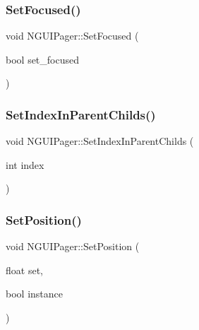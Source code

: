\hypertarget{class_n_g_u_i_pager_ab2f05ba0b7444f33beaf92d283229c4c}{}\label{class_n_g_u_i_pager_ab2f05ba0b7444f33beaf92d283229c4c} 
\subsubsection{\texorpdfstring{Set\+Focused()}{SetFocused()}}
{\footnotesize\ttfamily void N\+G\+U\+I\+Pager\+::\+Set\+Focused (\begin{DoxyParamCaption}\item[{bool}]{set\+\_\+focused }\end{DoxyParamCaption})}

\hypertarget{class_n_g_u_i_pager_a8d08d8f767486ec0a5f9ab402c1a97bc}{}\label{class_n_g_u_i_pager_a8d08d8f767486ec0a5f9ab402c1a97bc} 
\subsubsection{\texorpdfstring{Set\+Index\+In\+Parent\+Childs()}{SetIndexInParentChilds()}}
{\footnotesize\ttfamily void N\+G\+U\+I\+Pager\+::\+Set\+Index\+In\+Parent\+Childs (\begin{DoxyParamCaption}\item[{int}]{index }\end{DoxyParamCaption})}

\hypertarget{class_n_g_u_i_pager_a0b98e88e14d79df999474315c1eaf425}{}\label{class_n_g_u_i_pager_a0b98e88e14d79df999474315c1eaf425} 
\subsubsection{\texorpdfstring{Set\+Position()}{SetPosition()}}
{\footnotesize\ttfamily void N\+G\+U\+I\+Pager\+::\+Set\+Position (\begin{DoxyParamCaption}\item[{float}]{set,  }\item[{bool}]{instance }\end{DoxyParamCaption})}

\hypertarget{class_n_g_u_i_pager_aa6d94c2d38560a9babc5a07cf0c278a3}{}\label{class_n_g_u_i_pager_aa6d94c2d38560a9babc5a07cf0c278a3} 
